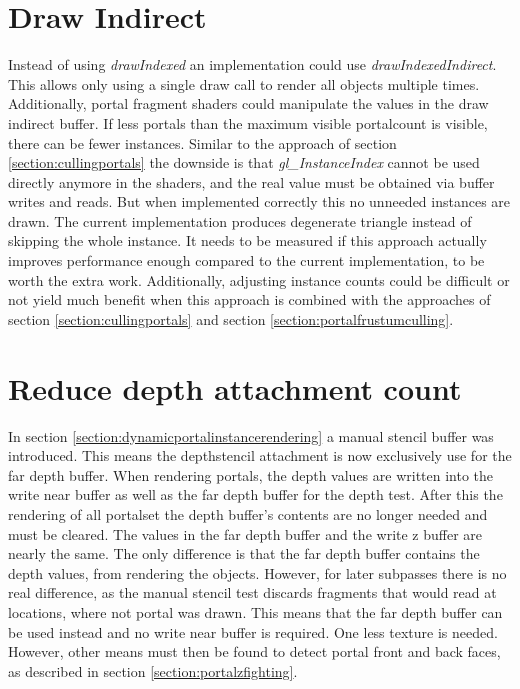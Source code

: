 \section{Draw Indirect}
Instead of using \textit{drawIndexed} an implementation could use \textit{drawIndexedIndirect}. This allows only using a single draw call to render all objects multiple times. Additionally, portal fragment shaders could manipulate the values in the draw indirect buffer. If less portals than the maximum visible \gls{portalcount} is visible, there can be fewer instances. Similar to the approach of section \ref{section:cullingportals} the downside is that \textit{gl\_InstanceIndex} cannot be used directly anymore in the shaders, and the real value must be obtained via buffer writes and reads. But when implemented correctly this no unneeded instances are drawn. The current implementation produces degenerate triangle instead of skipping the whole instance. It needs to be measured if this approach actually improves performance enough compared to the current implementation, to be worth the extra work. Additionally, adjusting instance counts could be difficult or not yield much benefit when this approach is combined with the approaches of section \ref{section:cullingportals} and section \ref{section:portalfrustumculling}.

\section{Reduce depth attachment count}

In section \ref{section:dynamicportalinstancerendering} a manual stencil buffer was introduced. This means the depthstencil attachment is now exclusively use for the far depth buffer. When rendering portals, the depth values are written into the write near buffer as well as the far depth buffer for the depth test. After this the rendering of all \gls{portalset} the depth buffer's contents are no longer needed and must be cleared. The values in the far depth buffer and the write z buffer are nearly the same. The only difference is that the far depth buffer contains the depth values, from rendering the objects. However, for later subpasses there is no real difference, as the manual stencil test discards fragments that would read at locations, where not portal was drawn. This means that the far depth buffer can be used instead and no write near buffer is required. One less texture is needed. However, other means must then be found to detect portal front and back faces, as described in section \ref{section:portalzfighting}.

